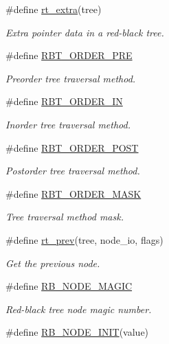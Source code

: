 \begin{CompactItemize}
\#define \hyperlink{group__dbprim__rbtree_ga24}{rt\_\-extra}(tree)
\begin{CompactList}\small\item\em Extra pointer data in a red-black tree. \item\end{CompactList}\item 
\#define \hyperlink{group__dbprim__rbtree_ga25}{RBT\_\-ORDER\_\-PRE}
\begin{CompactList}\small\item\em Preorder tree traversal method. \item\end{CompactList}\item 
\#define \hyperlink{group__dbprim__rbtree_ga26}{RBT\_\-ORDER\_\-IN}
\begin{CompactList}\small\item\em Inorder tree traversal method. \item\end{CompactList}\item 
\#define \hyperlink{group__dbprim__rbtree_ga27}{RBT\_\-ORDER\_\-POST}
\begin{CompactList}\small\item\em Postorder tree traversal method. \item\end{CompactList}\item 
\#define \hyperlink{group__dbprim__rbtree_ga28}{RBT\_\-ORDER\_\-MASK}
\begin{CompactList}\small\item\em Tree traversal method mask. \item\end{CompactList}\item 
\#define \hyperlink{group__dbprim__rbtree_ga29}{rt\_\-prev}(tree, node\_\-io, flags)
\begin{CompactList}\small\item\em Get the previous node. \item\end{CompactList}\item 
\#define \hyperlink{group__dbprim__rbtree_ga30}{RB\_\-NODE\_\-MAGIC}
\begin{CompactList}\small\item\em Red-black tree node magic number. \item\end{CompactList}\item 
\#define \hyperlink{group__dbprim__rbtree_ga31}{RB\_\-NODE\_\-INIT}(value)

\end{CompactItemize}
